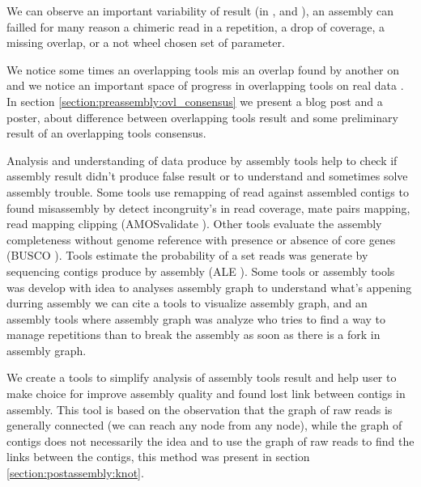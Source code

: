 \documentclass[./main.tex]{subfiles}
\begin{document}
We can observe an important variability of result (in \canu, \wtdbg and ), an assembly can failled for many reason a chimeric read in a repetition, a drop of coverage, a missing overlap, or a not wheel chosen set of parameter.

We notice some times an overlapping tools mis an overlap found by another on and we notice an important space of progress in overlapping tools on real data \cite{ovl_bench}. In section \ref{section:preassembly:ovl_consensus} we present a blog post and a poster, about difference between overlapping tools result and some preliminary result of an overlapping tools consensus.


Analysis and understanding of data produce by assembly tools help to check if assembly result didn't produce false result or to understand and sometimes solve assembly trouble. Some tools use remapping of read against assembled contigs to found misassembly by detect incongruity's in read coverage, mate pairs mapping, read mapping clipping (AMOSvalidate \cite{amosvalidate}).
Other tools evaluate the assembly completeness without genome reference with presence or absence of core genes (BUSCO \cite{busco}).
Tools estimate the probability of a set reads was generate by sequencing contigs produce by assembly (ALE \cite{ALE}). 
Some tools or assembly tools was develop with idea to analyses assembly graph to understand what's appening durring assembly we can cite  \cite{paper/} a tools to visualize assembly graph, and \hinge \cite{hinge} an assembly tools where assembly graph was analyze who tries to find a way to manage repetitions than to break the assembly as soon as there is a fork in assembly graph.

We create \knot a tools to simplify analysis of assembly tools result and help user to make choice for improve assembly quality and found lost link between contigs in assembly. This tool is based on the observation that the graph of raw reads is generally connected (we can reach any node from any node), while the graph of contigs does not necessarily the idea and to use the graph of raw reads to find the links between the contigs, this method was present in section \ref{section:postassembly:knot}.

\end{document}
